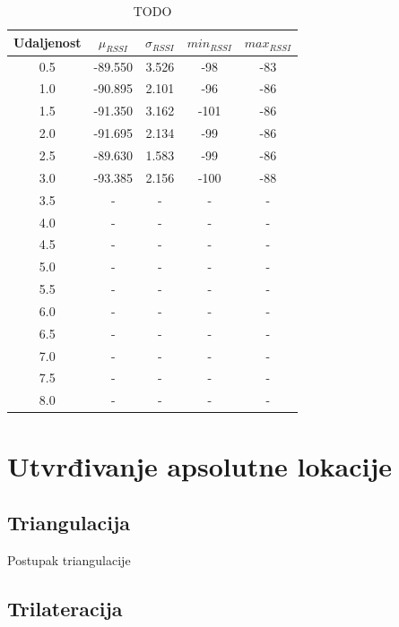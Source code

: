 \begin{table}
	\centering
	\caption{TODO}
	\label{tbl:blucatsDefault}
	\begin{tabular}{ccccc}
	\hline
	Udaljenost & $\mu_{RSSI}$ & $\sigma_{RSSI}$ & $min_{RSSI}$ & $max_{RSSI}$ \\
	\hline
	0.5 & -89.550 & 3.526 & -98 & -83 \\
	1.0 & -90.895 & 2.101 & -96 & -86 \\
	1.5 & -91.350 & 3.162 & -101 & -86 \\
	2.0 & -91.695 & 2.134 & -99 & -86 \\
	2.5 & -89.630 & 1.583 & -99 & -86 \\
	3.0 & -93.385 & 2.156 & -100 & -88 \\
	3.5 & - & - & - & - \\
	4.0 & - & - & - & - \\
	4.5 & - & - & - & - \\
	5.0 & - & - & - & - \\
	5.5 & - & - & - & - \\
	6.0 & - & - & - & - \\
	6.5 & - & - & - & - \\
	7.0 & - & - & - & - \\
	7.5 & - & - & - & - \\
	8.0 & - & - & - & - \\
	\hline
	\end{tabular}
\end{table}



\section*{Utvrđivanje apsolutne lokacije}

\subsection*{Triangulacija}

Postupak triangulacije

\subsection*{Trilateracija}
